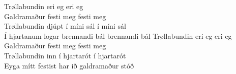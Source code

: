 \begin{flushleft}
Trøllabundin eri eg eri eg\\
Galdramaður festi meg festi meg\\
Trøllabundin djúpt í míni sál í míni sál\\
Í hjartanum logar brennandi bál brennandi bál
\hops
Trøllabundin eri eg eri eg\\
Galdramaður festi meg festi meg\\
Trøllabundin inn í hjartarót í hjartarót\\
Eyga mítt festist har ið galdramaður stóð\\
\end{flushleft}
\newpage